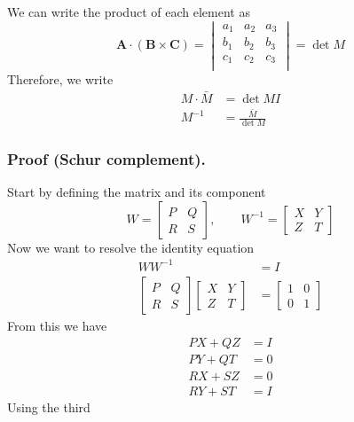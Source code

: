 \documentclass[../../../main.tex]{subfiles}
\begin{document}
We can write the product of each element as
\begin{equation*}
	\mathbf{A }\cdot \left( \mathbf{B }\times \mathbf{C } \right) =
	\begin{vmatrix}
		a_1 & a_2 & a_3 \\
		b_1 & b_2 & b_3 \\
		c_1 & c_2 & c_3 \\
	\end{vmatrix}
	=\det M
\end{equation*}
Therefore, we write
\begin{align*}
	M \cdot \bar{M } & =\det M I                 \\
	M^{-1}           & =\frac{\bar{M }}{\det M }
\end{align*}

\subsubsection{Proof (Schur complement).}
Start by defining the matrix and its component
\begin{equation*}
	W = \begin{bmatrix} P & Q \\ R & S \end{bmatrix},\qquad
	W^{-1} = \begin{bmatrix} X & Y \\ Z & T \end{bmatrix}
\end{equation*}
Now we want to resolve the identity  equation
\begin{align*}
	WW^{-1} & =  I \\
	\begin{bmatrix} P & Q \\ R & S \end{bmatrix}
	\begin{bmatrix} X & Y \\ Z & T \end{bmatrix}
	        & =
	\begin{bmatrix}
		1 & 0 \\
		0 & 1
	\end{bmatrix}
\end{align*}
From this we have
\begin{align*}
	PX + QZ & =  I \\
	PY + QT & = 0  \\
	RX + SZ & = 0  \\
	RY + ST & =  I
\end{align*}
Using the third
\end{document}
